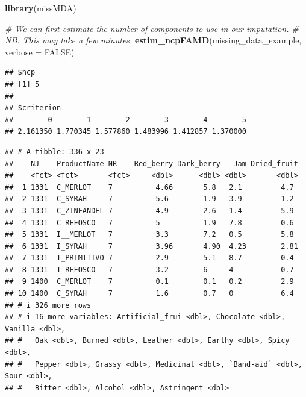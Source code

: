 \documentclass[
]{book}
\newenvironment{Shaded}{\begin{snugshade}}{\end{snugshade}}
\newcommand{\AttributeTok}[1]{\textcolor[rgb]{0.13,0.29,0.53}{#1}}
\newcommand{\CommentTok}[1]{\textcolor[rgb]{0.56,0.35,0.01}{\textit{#1}}}
\newcommand{\ConstantTok}[1]{\textcolor[rgb]{0.56,0.35,0.01}{#1}}
\newcommand{\DecValTok}[1]{\textcolor[rgb]{0.00,0.00,0.81}{#1}}
\newcommand{\FunctionTok}[1]{\textcolor[rgb]{0.13,0.29,0.53}{\textbf{#1}}}
\newcommand{\NormalTok}[1]{#1}
\newcommand{\OtherTok}[1]{\textcolor[rgb]{0.56,0.35,0.01}{#1}}
\newcommand{\SpecialCharTok}[1]{\textcolor[rgb]{0.81,0.36,0.00}{\textbf{#1}}}
\begin{document}
\begin{Shaded}
\begin{Highlighting}[]
\FunctionTok{library}\NormalTok{(missMDA)}

\CommentTok{\# We can first estimate the number of components to use in our imputation.}
\CommentTok{\# NB: This may take a few minutes.}
\FunctionTok{estim\_ncpFAMD}\NormalTok{(missing\_data\_example, }\AttributeTok{verbose =} \ConstantTok{FALSE}\NormalTok{)}
\end{Highlighting}
\end{Shaded}

\begin{verbatim}
## $ncp
## [1] 5
## 
## $criterion
##        0        1        2        3        4        5 
## 2.161350 1.770345 1.577860 1.483996 1.412857 1.370000
\end{verbatim}

\begin{Shaded}
\end{Shaded}

\begin{verbatim}
## # A tibble: 336 x 23
##    NJ    ProductName NR    Red_berry Dark_berry   Jam Dried_fruit
##    <fct> <fct>       <fct>     <dbl>      <dbl> <dbl>       <dbl>
##  1 1331  C_MERLOT    7          4.66       5.8   2.1         4.7 
##  2 1331  C_SYRAH     7          5.6        1.9   3.9         1.2 
##  3 1331  C_ZINFANDEL 7          4.9        2.6   1.4         5.9 
##  4 1331  C_REFOSCO   7          5          1.9   7.8         0.6 
##  5 1331  I__MERLOT   7          3.3        7.2   0.5         5.8 
##  6 1331  I_SYRAH     7          3.96       4.90  4.23        2.81
##  7 1331  I_PRIMITIVO 7          2.9        5.1   8.7         0.4 
##  8 1331  I_REFOSCO   7          3.2        6     4           0.7 
##  9 1400  C_MERLOT    7          0.1        0.1   0.2         2.9 
## 10 1400  C_SYRAH     7          1.6        0.7   0           6.4 
## # i 326 more rows
## # i 16 more variables: Artificial_frui <dbl>, Chocolate <dbl>, Vanilla <dbl>,
## #   Oak <dbl>, Burned <dbl>, Leather <dbl>, Earthy <dbl>, Spicy <dbl>,
## #   Pepper <dbl>, Grassy <dbl>, Medicinal <dbl>, `Band-aid` <dbl>, Sour <dbl>,
## #   Bitter <dbl>, Alcohol <dbl>, Astringent <dbl>
\end{verbatim}
\end{document}
